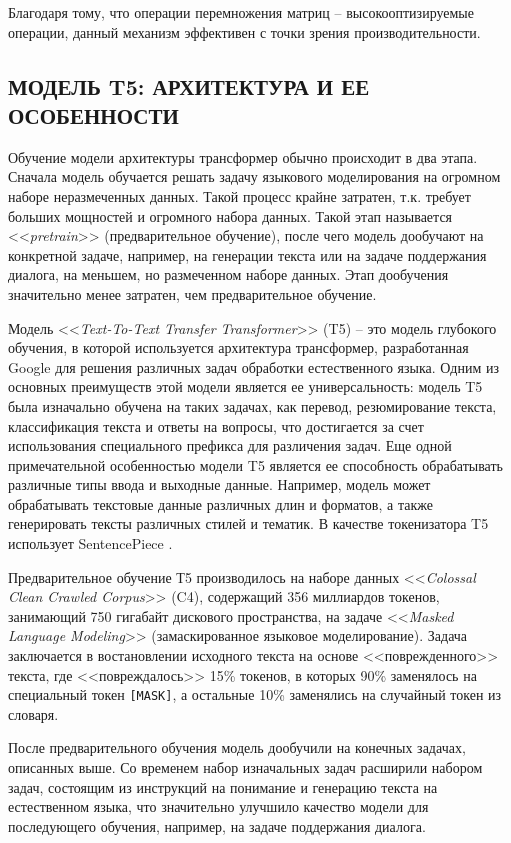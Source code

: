 Благодаря тому, что операции перемножения матриц -- высокооптизируемые операции, данный механизм эффективен с точки зрения производительности.

\subsection{МОДЕЛЬ T5: АРХИТЕКТУРА И ЕЕ ОСОБЕННОСТИ}
Обучение модели архитектуры трансформер обычно происходит в два этапа. Сначала модель обучается решать задачу языкового моделирования на огромном наборе неразмеченных данных. Такой процесс крайне затратен, т.к. требует больших мощностей и огромного набора данных. Такой этап называется <<\textit{pretrain}>> (предварительное обучение), после чего модель дообучают на конкретной задаче, например, на генерации текста или на задаче поддержания диалога, на меньшем, но размеченном наборе данных. Этап дообучения значительно менее затратен, чем предварительное обучение.

Модель <<\textit{Text-To-Text Transfer Transformer}>> (T5) -- это модель глубокого обучения, в которой используется архитектура трансформер, разработанная Google для решения различных задач обработки естественного языка. Одним из основных преимуществ этой модели является ее универсальность: модель T5 была изначально обучена на таких задачах, как перевод, резюмирование текста, классификация текста и ответы на вопросы, что достигается за счет использования специального префикса для различения задач. Еще одной примечательной особенностью модели T5 является ее способность обрабатывать различные типы ввода и выходные данные. Например, модель может обрабатывать текстовые данные различных длин и форматов, а также генерировать тексты различных стилей и тематик. В качестве токенизатора T5 использует SentencePiece \cite{sentencepiece-paper}.

Предварительное обучение Т5 производилось на наборе данных <<\textit{Colossal Clean Crawled Corpus}>> (C4), содержащий 356 миллиардов токенов, занимающий 750 гигабайт дискового пространства, на задаче <<\textit{Masked Language Modeling}>> (замаскированное языковое моделирование). Задача заключается в востановлении исходного текста на основе <<поврежденного>> текста, где <<повреждалось>> 15\% токенов, в которых 90\% заменялось на специальный токен \texttt{[MASK]}, а остальные 10\% заменялись на случайный токен из словаря.

После предварительного обучения модель дообучили на конечных задачах, описанных выше. Со временем набор изначальных задач расширили набором задач, состоящим из инструкций на понимание и генерацию текста на естественном языка, что значительно улучшило качество модели для последующего обучения, например, на задаче поддержания диалога.

